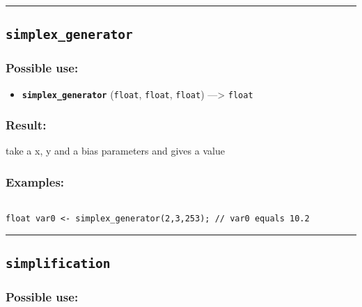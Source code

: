 \documentclass[]{book}
\providecommand{\tightlist}{%
  \setlength{\itemsep}{0pt}\setlength{\parskip}{0pt}}
\theoremstyle{definition}
\theoremstyle{definition}
\theoremstyle{definition}
\theoremstyle{remark}
\begin{document}
\begin{center}\rule{0.5\linewidth}{\linethickness}\end{center}

\subsection{\texorpdfstring{\texttt{simplex\_generator}}{simplex\_generator}}\label{simplex_generator}

\subsubsection{Possible use:}\label{possible-use-474}

\begin{itemize}
\tightlist
\item
  \textbf{\texttt{simplex\_generator}} (\texttt{float}, \texttt{float},
  \texttt{float}) ---\textgreater{} \texttt{float}
\end{itemize}

\subsubsection{Result:}\label{result-458}

take a x, y and a bias parameters and gives a value

\subsubsection{Examples:}\label{examples-330}

\begin{verbatim}
 
float var0 <- simplex_generator(2,3,253); // var0 equals 10.2
\end{verbatim}

\begin{center}\rule{0.5\linewidth}{\linethickness}\end{center}

\subsection{\texorpdfstring{\texttt{simplification}}{simplification}}\label{simplification}

\subsubsection{Possible use:}\label{possible-use-475}
\end{document}
